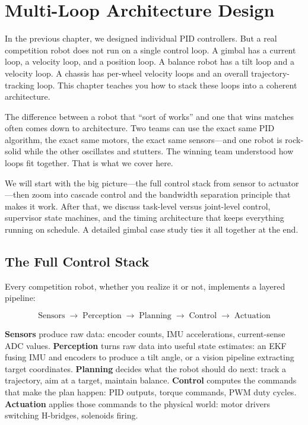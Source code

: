 \section{Multi-Loop Architecture Design}

In the previous chapter, we designed individual PID controllers. But a real competition robot does not run on a single control loop. A gimbal has a current loop, a velocity loop, and a position loop. A balance robot has a tilt loop and a velocity loop. A chassis has per-wheel velocity loops and an overall trajectory-tracking loop. This chapter teaches you how to stack these loops into a coherent architecture.

The difference between a robot that ``sort of works'' and one that wins matches often comes down to architecture. Two teams can use the exact same PID algorithm, the exact same motors, the exact same sensors---and one robot is rock-solid while the other oscillates and stutters. The winning team understood how loops fit together. That is what we cover here.

We will start with the big picture---the full control stack from sensor to actuator---then zoom into cascade control and the bandwidth separation principle that makes it work. After that, we discuss task-level versus joint-level control, supervisor state machines, and the timing architecture that keeps everything running on schedule. A detailed gimbal case study ties it all together at the end.

\subsection{The Full Control Stack}

Every competition robot, whether you realize it or not, implements a layered pipeline:

\[
\text{Sensors} \;\longrightarrow\; \text{Perception} \;\longrightarrow\; \text{Planning} \;\longrightarrow\; \text{Control} \;\longrightarrow\; \text{Actuation}
\]

\textbf{Sensors} produce raw data: encoder counts, IMU accelerations, current-sense ADC values. \textbf{Perception} turns raw data into useful state estimates: an EKF fusing IMU and encoders to produce a tilt angle, or a vision pipeline extracting target coordinates. \textbf{Planning} decides what the robot should do next: track a trajectory, aim at a target, maintain balance. \textbf{Control} computes the commands that make the plan happen: PID outputs, torque commands, PWM duty cycles. \textbf{Actuation} applies those commands to the physical world: motor drivers switching H-bridges, solenoids firing.

